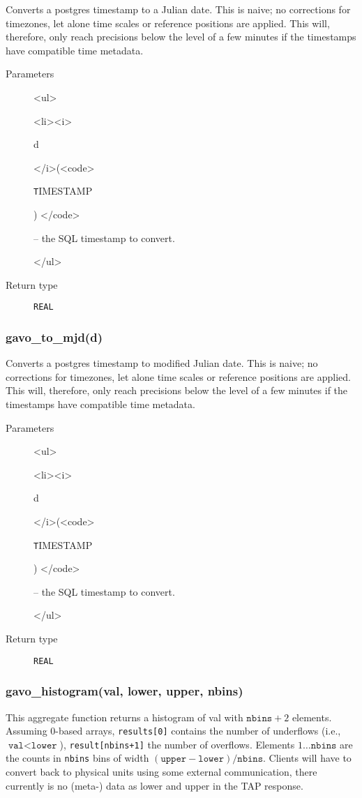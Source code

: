 \documentclass[11pt,a4paper]{ivoa}
\newenvironment{args}%
{\begin{html}<ul>\end{html}\def\arg##1(##2){\begin{html}<li><i>\end{html}%
  ##1 \begin{html}</i>(<code>\end{html}##2\begin{html}) </code>\end{html}}}%
{\begin{html}</ul>\end{html}}
\newenvironment{args}%
  {\hfil %
    \def\arg##1(##2){\item {\textit{##1} (\texttt{##2})}}
    \begin{list}{$\bullet$}{\topsep=0pt\partopsep=0pt\parsep=0pt}
    }%
  {\end{list}}
\begin{document}
Converts a postgres timestamp to a Julian date. This is naive;
no corrections for timezones, let alone time scales or reference
positions are applied.  This will, therefore, only reach precisions
below the level of a few minutes if the timestamps have compatible time
metadata.

\begin{description}
\item[Parameters]
\begin{args}
	\arg d (\texttt{TIMESTAMP}) -- the SQL timestamp to convert.
\end{args}

\item[Return type] \texttt{REAL}
\end{description}


\subsubsection{gavo\_to\_mjd(d)}

Converts a postgres timestamp to modified Julian date. This is naive; 
no corrections for timezones, let alone time scales or reference
positions are applied.  This will, therefore, only reach precisions
below the level of a few minutes if the timestamps have compatible time
metadata.

\begin{description}
\item[Parameters]
\begin{args}
	\arg d (\texttt{TIMESTAMP}) -- the SQL timestamp to convert.
\end{args}

\item[Return type] \texttt{REAL}
\end{description}


\subsubsection{gavo\_histogram(val, lower, upper, nbins)}

This aggregate function returns a histogram of val with
$\texttt{nbins}+2$ elements.  Assuming 0-based arrays, \verb|results[0]|
contains the number of underflows (i.e., $\texttt{val}<\texttt{lower}$),
\verb|result[nbins+1]| the number of overflows. Elements
$1\ldots\texttt{nbins}$ are the counts in \texttt{nbins} bins of width
$(\texttt{upper}-\texttt{lower})/\texttt{nbins}$.  Clients will have to
convert back to physical units using some external communication, there
currently is no (meta-) data as lower and upper in the TAP response.
\end{document}

